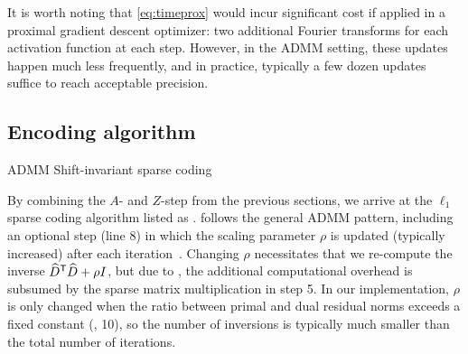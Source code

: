 \documentclass{article} %
\begin{document}
It is worth noting that \eqref{eq:timeprox} would incur significant cost if applied 
in a proximal gradient descent optimizer: two additional Fourier transforms 
for each activation function at each step.  However, in the ADMM setting, these updates 
happen much less frequently, and in practice, typically a few dozen updates suffice to 
reach acceptable precision.

\subsection{Encoding algorithm}
\label{sec:algorithm}

\begin{algorithm}[t]
\caption{ADMM Shift-invariant sparse coding}
\label{alg:sisc}
\begin{algorithmic}[1]


\REPEAT{}

    
    

\end{algorithmic}
\end{algorithm}

By combining the $A$- and $Z$-step from the previous sections, we arrive at the
$\ell_1$ sparse coding algorithm listed as .   follows
the general ADMM pattern, including an optional step (line 8) in which the scaling 
parameter $\rho$ is updated (typically increased) after each iteration~\cite{boyd2011}.
Changing $\rho$ necessitates that we re-compute the inverse
${\widehat{D}^\mathsf{T}\widehat{D} + \rho I}$, but due to , the
additional computational overhead is subsumed by the sparse matrix multiplication 
in step 5.  In our implementation, $\rho$ is only changed when the ratio between primal 
and dual residual norms exceeds a fixed constant (\eg, 10), so the number of inversions
is typically much smaller than the total number of iterations.
\end{document}
